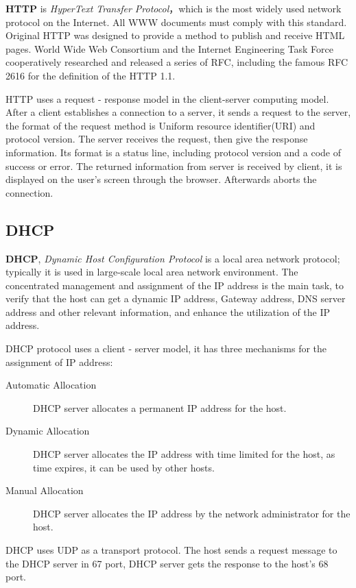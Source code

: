 \textbf{HTTP} is \textit{HyperText Transfer Protocol}，which is the most widely used network protocol on the Internet. All WWW documents must comply with this standard. Original HTTP was designed to provide a method to publish and receive HTML pages. World Wide Web Consortium and the Internet Engineering Task Force cooperatively researched and released a series of RFC, including the famous RFC 2616 for the definition of the HTTP 1.1.   

HTTP uses a request - response model in the client-server computing model. After a client establishes a connection to a server, it sends a request to the server, the format of the request method is Uniform resource identifier(URI) and protocol version. The server receives the request, then give the response information. Its format is a status line, including protocol version and a code of success or error. The returned information from server is received by client, it is displayed on the user's screen through the browser. Afterwards aborts the connection.

\subsection{DHCP}
\textbf{DHCP}, \textit{Dynamic Host Configuration Protocol} is a local area network protocol; typically it is used in large-scale local area network environment. The concentrated management and assignment of the IP address is the main task, to verify that the host can get a dynamic IP address, Gateway address, DNS server address and other relevant information, and enhance the utilization of the IP address.  

DHCP protocol uses a client - server model, it has three mechanisms for the assignment of IP address:

\begin{description}
	\item[Automatic Allocation] DHCP server allocates a permanent IP address for the host.
	\item[Dynamic Allocation] DHCP server allocates the IP address with time limited for the host, as time expires, it can be used by other hosts.
	\item[Manual Allocation] DHCP server allocates the IP address by the network administrator for the host.
\end{description}

DHCP uses UDP as a transport protocol. The host sends a request message to the DHCP server in 67 port, DHCP server gets the response to the host's 68 port.

